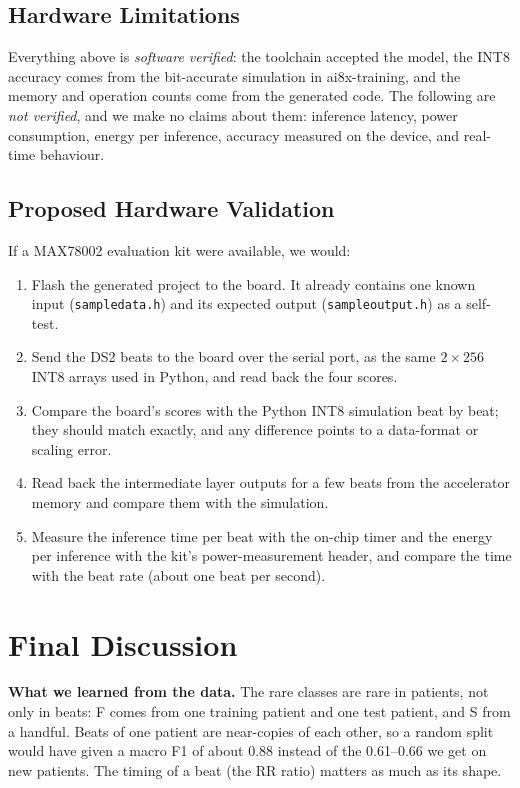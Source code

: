 \documentclass[11pt,a4paper]{article}
\newcommand{\code}[1]{\texttt{#1}}
\begin{document}
\subsection{Hardware Limitations}
\label{sec:hwlimits}

Everything above is \emph{software verified}: the toolchain accepted the model, the INT8 accuracy comes from the bit-accurate simulation in ai8x-training, and the memory and operation counts come from the generated code. The following are \emph{not verified}, and we make no claims about them: inference latency, power consumption, energy per inference, accuracy measured on the device, and real-time behaviour.

\subsection{Proposed Hardware Validation}

If a MAX78002 evaluation kit were available, we would:
\begin{enumerate}
  \item Flash the generated project to the board. It already contains one known input (\code{sampledata.h}) and its expected output (\code{sampleoutput.h}) as a self-test.
  \item Send the DS2 beats to the board over the serial port, as the same $2 \times 256$ INT8 arrays used in Python, and read back the four scores.
  \item Compare the board's scores with the Python INT8 simulation beat by beat; they should match exactly, and any difference points to a data-format or scaling error.
  \item Read back the intermediate layer outputs for a few beats from the accelerator memory and compare them with the simulation.
  \item Measure the inference time per beat with the on-chip timer and the energy per inference with the kit's power-measurement header, and compare the time with the beat rate (about one beat per second).
\end{enumerate}

\section{Final Discussion}

\textbf{What we learned from the data.} The rare classes are rare in patients, not only in beats: F comes from one training patient and one test patient, and S from a handful. Beats of one patient are near-copies of each other, so a random split would have given a macro F1 of about 0.88 instead of the 0.61--0.66 we get on new patients. The timing of a beat (the RR ratio) matters as much as its shape.
\end{document}
